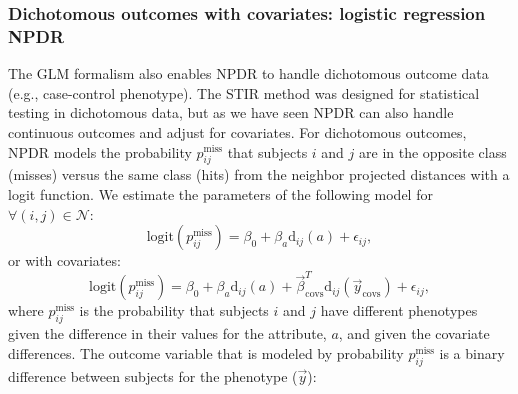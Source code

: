 \documentclass[10pt]{article}
\begin{document}
\subsubsection{Dichotomous outcomes with covariates: logistic regression NPDR}
The GLM formalism also enables NPDR to handle dichotomous outcome data (e.g., case-control phenotype).
The STIR method was designed for statistical testing in dichotomous data, but as we have seen NPDR can also handle continuous outcomes and adjust for covariates.
For dichotomous outcomes, NPDR models the probability $p^{\text{miss}}_{ij}$ that subjects $i$ and $j$ are in the opposite class (misses) versus the same class (hits) from the neighbor projected distances with a logit function.
We estimate the parameters of the following model for $\forall(i,j) \in \mathcal{N}$:   
\begin{equation}\label{eq:logit_nocovar}
\text{logit}(p^{\text{miss}}_{ij}) = \beta_0 + \beta_a \text{d}_{ij}(a) + \epsilon_{ij},   
\end{equation}
or with covariates:
\begin{equation}\label{eq:too_logit}
\text{logit}(p^{\text{miss}}_{ij}) = \beta_0 + \beta_a \text{d}_{ij}(a) + \vec{\beta}^{T}_{\text{covs}} \text{d}_{ij}(\vec{y}_{\text{covs}}) + \epsilon_{ij},   
\end{equation}
where $p^{\text{miss}}_{ij}$ is the probability that subjects $i$ and $j$ have different phenotypes given the difference in their values for the attribute, $a$, and given the covariate differences.
The outcome variable that is modeled by probability $p^{\text{miss}}_{ij}$ is a binary difference between subjects for the phenotype ($\vec{y}$):
   
\end{document}

